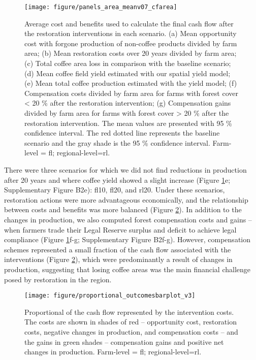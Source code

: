 \documentclass[
	12pt,				%
	oneside,			%
	a4paper,			%
	chapter=TITLE,		%
	section=TITLE,		%
	brazil,			%
	english				%
	]{abntex2}
\begin{document}
\begin{figure}[H]

{\centering \texttt{[image: figure/panels\_area\_meanv07\_cfarea]} 

}

\caption{Average cost and benefits used to calculate the final cash flow after the restoration interventions in each scenario. (a) Mean opportunity cost with forgone production of non-coffee products divided by farm area; (b)  Mean restoration costs over 20 years divided by farm area; (c)  Total coffee area loss in comparison with the baseline scenario; (d) Mean coffee field yield estimated with our spatial yield model; (e) Mean total coffee production estimated with the yield model; (f) Compensation costs divided by farm area for farms with forest cover < 20 \% after the restoration intervention; (g) Compensation gains divided by farm area for farms with forest cover > 20 \% after the restoration intervention. The mean values are presented with  95 \% confidence interval. The red dotted line represents the baseline scenario and the gray shade is the 95 \% confidence interval. Farm-level = fl; regional-level=rl. }\label{fig:painel}
\end{figure}
There were three scenarios for which we did not find reductions in production after 20 years and where coffee yield showed a slight increase (Figure \ref{fig:painel}e; Supplementary Figure B2e): fl10, fl20, and rl20. Under these scenarios, restoration actions were more advantageous economically, and the relationship between costs and benefits was more balanced (Figure \ref{fig:fig3}). In addition to the changes in production, we also computed forest compensation costs and gains -- when farmers trade their Legal Reserve surplus and deficit to achieve legal compliance (Figure \ref{fig:painel}f-g; Supplementary Figure B2f-g). However, compensation schemes represented a small fraction of the cash flow associated with the interventions (Figure \ref{fig:fig3}), which were predominantly a result of changes in production, suggesting that losing coffee areas was the main financial challenge posed by restoration in the region.
\begin{figure}[H]

{\centering \texttt{[image: figure/proportional\_outcomesbarplot\_v3]} 

}

\caption{Proportional of the cash flow represented by the intervention costs. The costs are shown in shades of red – opportunity cost, restoration costs, negative changes in production, and compensation costs – and the gains in green shades  – compensation gains and positive net changes in production. Farm-level = fl; regional-level=rl.  }\label{fig:fig3}
\end{figure}
\end{document}
